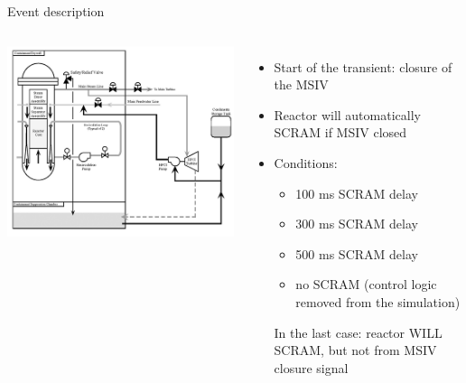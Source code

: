 \begin{frame}{Event description}
	\begin{columns}
		\centering
		\includegraphics[width=\linewidth]{./graphs/BWR.jpg}
		\begin{itemize}
			\small
			\item Start of the transient: closure of the MSIV
			\item Reactor will automatically SCRAM if MSIV closed
			\item Conditions:
			\begin{itemize}
				\item 100 ms SCRAM delay
				\item 300 ms SCRAM delay
				\item 500 ms SCRAM delay
				\item no SCRAM (control logic removed from the simulation)
			\end{itemize}
			In the last case: reactor WILL SCRAM, but not from MSIV closure signal
		\end{itemize}
	\end{columns}
	\end{frame}
